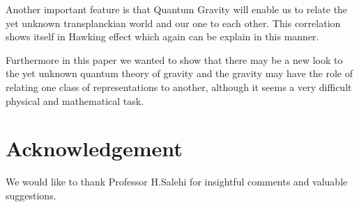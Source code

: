 \documentclass[12pt]{article}
\begin{document}
Another important feature is that Quantum Gravity will enable us to relate the yet unknown transplanckian world and our one to each other. This correlation shows itself in Hawking effect which again can be explain in this manner.

Furthermore in this paper we wanted to show that there may be a new look to the yet unknown quantum theory of gravity and the gravity may have the role of relating one class of representations to another, although it seems a very difficult physical and mathematical task.
\section*{Acknowledgement}
We would like to thank Professor H.Salehi for insightful comments and valuable suggestions.


\end{document}
